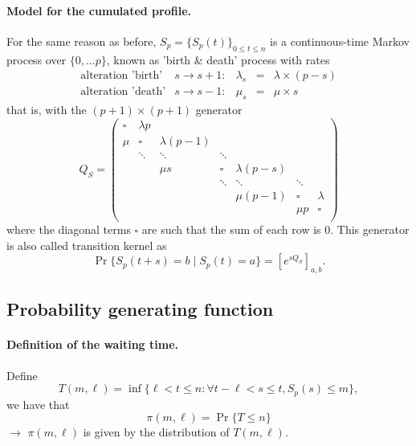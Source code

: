 \documentclass[a4paper,12pt]{article}
\newcommand{\ra}{$\rightarrow$ \xspace}
\begin{document}
\paragraph{Model for the cumulated profile.} For the same reason as before, $S_p = \{S_p(t)\}_{0 \leq t \leq n}$ is a continuous-time Markov process over $\{0, \dots p\}$, known as 'birth \& death' process with rates
$$
\begin{array}{llrcl}
  \text{alteration 'birth'} & s \rightarrow s+1: & \lambda_s & = & \lambda \times (p-s)\\
  \text{alteration 'death'} & s \rightarrow s-1: & \mu_s & = & \mu \times s
\end{array}
$$
that is, with the $(p+1) \times (p+1)$ generator 
$$
Q_S = \left(
  \begin{array}{cccccccc}
   \square & \lambda p \\
   \mu & \square & \lambda (p-1) \\
   & \ddots & \ddots & \ddots & \\
   & & \mu s & \square & \lambda (p-s) \\
   & & & \ddots & \ddots & \ddots & \\
   & & & & \mu (p-1) & \square & \lambda \\
   & & & & & \mu p & \square \\
  \end{array}
\right)
$$
where the diagonal terms $\square$ are such that the sum of each row is 0. This generator is also called transition kernel as
$$
\Pr\{S_p(t+s) = b \;|\; S_p(t) = a\} = \left[e^{s Q_S}\right]_{a, b}.
$$

\subsection{Probability generating function}

\paragraph{Definition of the waiting time.} Define
$$
T(m, \ell) = \inf\{\ell < t \leq n: \forall t-\ell < s \leq t, S_p(s) \leq m \},
$$
we have that
$$
\pi(m, \ell) = \Pr\{T \leq n\}
$$
\ra $\pi(m, \ell)$ is given by the distribution of $T(m, \ell)$.
\end{document}
